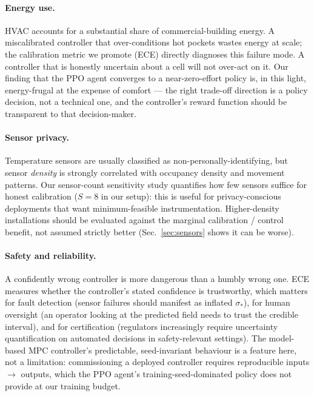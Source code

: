 \documentclass[11pt,letterpaper]{article}
\begin{document}
\paragraph{Energy use.} HVAC accounts for a substantial share of
commercial-building energy. A miscalibrated controller that
over-conditions hot pockets wastes energy at scale; the calibration
metric we promote (ECE) directly diagnoses this failure mode. A
controller that is honestly uncertain about a cell will not over-act
on it. Our finding that the PPO agent converges to a near-zero-effort
policy is, in this light, energy-frugal at the expense of comfort ---
the right trade-off direction is a policy decision, not a technical
one, and the controller's reward function should be transparent to
that decision-maker.

\paragraph{Sensor privacy.} Temperature sensors are usually classified
as non-personally-identifying, but sensor \emph{density} is strongly
correlated with occupancy density and movement patterns. Our
sensor-count sensitivity study quantifies how few sensors suffice
for honest calibration ($S = 8$ in our setup): this is useful for
privacy-conscious deployments that want minimum-feasible
instrumentation. Higher-density installations should be evaluated
against the marginal calibration / control benefit, not assumed
strictly better (Sec.~\ref{sec:sensors} shows it can be worse).

\paragraph{Safety and reliability.} A confidently wrong controller is
more dangerous than a humbly wrong one. ECE measures whether the
controller's stated confidence is trustworthy, which matters for fault
detection (sensor failures should manifest as inflated $\sigma_*$), for
human oversight (an operator looking at the predicted field needs to
trust the credible interval), and for certification (regulators
increasingly require uncertainty quantification on automated decisions
in safety-relevant settings). The model-based MPC controller's
predictable, seed-invariant behaviour is a feature here, not a
limitation: commissioning a deployed controller requires reproducible
inputs $\to$ outputs, which the PPO agent's training-seed-dominated
policy does not provide at our training budget.
\end{document}

